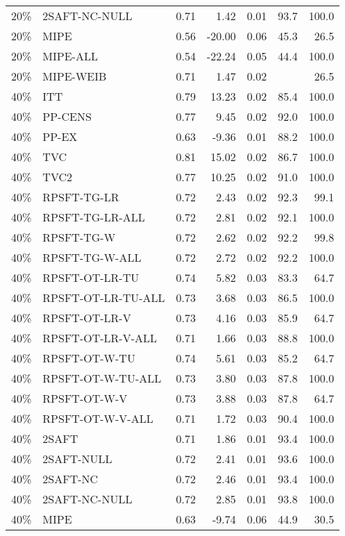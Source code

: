 \begin{table}[ht]
{\begin{tabular}{llrrrrr}
  20\% & 2SAFT-NC-NULL & 0.71 & 1.42 & 0.01 & 93.7 & 100.0 \\ 
  20\% & MIPE & 0.56 & -20.00 & 0.06 & 45.3 & 26.5 \\ 
  20\% & MIPE-ALL & 0.54 & -22.24 & 0.05 & 44.4 & 100.0 \\ 
  20\% & MIPE-WEIB & 0.71 & 1.47 & 0.02 &  & 26.5 \\ 
   \hline
40\% & ITT & 0.79 & 13.23 & 0.02 & 85.4 & 100.0 \\ 
  40\% & PP-CENS & 0.77 & 9.45 & 0.02 & 92.0 & 100.0 \\ 
  40\% & PP-EX & 0.63 & -9.36 & 0.01 & 88.2 & 100.0 \\ 
  40\% & TVC & 0.81 & 15.02 & 0.02 & 86.7 & 100.0 \\ 
  40\% & TVC2 & 0.77 & 10.25 & 0.02 & 91.0 & 100.0 \\ 
   \hline
40\% & RPSFT-TG-LR & 0.72 & 2.43 & 0.02 & 92.3 & 99.1 \\ 
  40\% & RPSFT-TG-LR-ALL & 0.72 & 2.81 & 0.02 & 92.1 & 100.0 \\ 
  40\% & RPSFT-TG-W & 0.72 & 2.62 & 0.02 & 92.2 & 99.8 \\ 
  40\% & RPSFT-TG-W-ALL & 0.72 & 2.72 & 0.02 & 92.2 & 100.0 \\ 
  40\% & RPSFT-OT-LR-TU & 0.74 & 5.82 & 0.03 & 83.3 & 64.7 \\ 
  40\% & RPSFT-OT-LR-TU-ALL & 0.73 & 3.68 & 0.03 & 86.5 & 100.0 \\ 
  40\% & RPSFT-OT-LR-V & 0.73 & 4.16 & 0.03 & 85.9 & 64.7 \\ 
  40\% & RPSFT-OT-LR-V-ALL & 0.71 & 1.66 & 0.03 & 88.8 & 100.0 \\ 
   \hline
40\% & RPSFT-OT-W-TU & 0.74 & 5.61 & 0.03 & 85.2 & 64.7 \\ 
  40\% & RPSFT-OT-W-TU-ALL & 0.73 & 3.80 & 0.03 & 87.8 & 100.0 \\ 
  40\% & RPSFT-OT-W-V & 0.73 & 3.88 & 0.03 & 87.8 & 64.7 \\ 
  40\% & RPSFT-OT-W-V-ALL & 0.71 & 1.72 & 0.03 & 90.4 & 100.0 \\ 
   \hline
40\% & 2SAFT & 0.71 & 1.86 & 0.01 & 93.4 & 100.0 \\ 
  40\% & 2SAFT-NULL & 0.72 & 2.41 & 0.01 & 93.6 & 100.0 \\ 
  40\% & 2SAFT-NC & 0.72 & 2.46 & 0.01 & 93.4 & 100.0 \\ 
  40\% & 2SAFT-NC-NULL & 0.72 & 2.85 & 0.01 & 93.8 & 100.0 \\ 
  40\% & MIPE & 0.63 & -9.74 & 0.06 & 44.9 & 30.5 \\ 

\end{tabular}}
\end{table}
